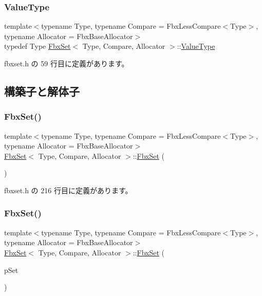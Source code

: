 \subsubsection{\texorpdfstring{Value\+Type}{ValueType}}
{\footnotesize\ttfamily template$<$typename Type, typename Compare = Fbx\+Less\+Compare$<$\+Type$>$, typename Allocator = Fbx\+Base\+Allocator$>$ \\
typedef Type \hyperlink{class_fbx_set}{Fbx\+Set}$<$ Type, Compare, Allocator $>$\+::\hyperlink{class_fbx_set_abb0f1b628634e07825532526e2e92baf}{Value\+Type}}



 fbxset.\+h の 59 行目に定義があります。



\subsection{構築子と解体子}
\mbox{\label{class_fbx_set_ae540e486ff517af7f865c8a1c499df79}} 
\subsubsection{\texorpdfstring{Fbx\+Set()}{FbxSet()}\hspace{0.1cm}{\footnotesize\ttfamily [1/2]}}
{\footnotesize\ttfamily template$<$typename Type, typename Compare = Fbx\+Less\+Compare$<$\+Type$>$, typename Allocator = Fbx\+Base\+Allocator$>$ \\
\hyperlink{class_fbx_set}{Fbx\+Set}$<$ Type, Compare, Allocator $>$\+::\hyperlink{class_fbx_set}{Fbx\+Set} (\begin{DoxyParamCaption}{ }\end{DoxyParamCaption})\hspace{0.3cm}{\ttfamily [inline]}}



 fbxset.\+h の 216 行目に定義があります。

\mbox{\label{class_fbx_set_a83bf0b02ec208241ffbc725db1d9c70d}} 
\subsubsection{\texorpdfstring{Fbx\+Set()}{FbxSet()}\hspace{0.1cm}{\footnotesize\ttfamily [2/2]}}
{\footnotesize\ttfamily template$<$typename Type, typename Compare = Fbx\+Less\+Compare$<$\+Type$>$, typename Allocator = Fbx\+Base\+Allocator$>$ \\
\hyperlink{class_fbx_set}{Fbx\+Set}$<$ Type, Compare, Allocator $>$\+::\hyperlink{class_fbx_set}{Fbx\+Set} (\begin{DoxyParamCaption}\item[{const \hyperlink{class_fbx_set}{Fbx\+Set}$<$ Type, Compare, Allocator $>$ \&}]{p\+Set }\end{DoxyParamCaption})\hspace{0.3cm}{\ttfamily [inline]}}




